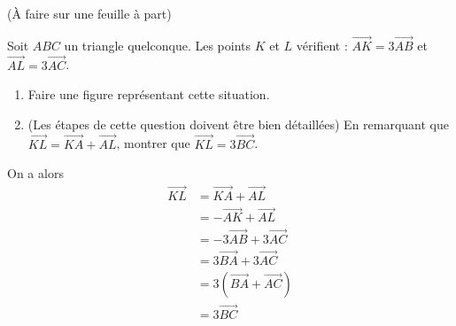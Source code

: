 \documentclass[
	classe=$2^{de}$
]{évaluation}
\begin{document}
\begin{exercice}(À faire sur une feuille à part)

	Soit $ABC$ un triangle quelconque. Les points $K$ et $L$ vérifient : $\vec{AK} = 3\vec{AB}$ et $\vec{AL} = 3\vec{AC}$.
	\begin{enumerate}
		\item Faire une figure représentant cette situation.
		\item (Les étapes de cette question doivent être bien détaillées) En remarquant que $\vec{KL} = \vec{KA} + \vec{AL}$, montrer que $\vec{KL} = 3\vec{BC}$.
	\end{enumerate}

	\ifdefined\makeCorrection
		\begin{center}
		\end{center}

		{\color{red}
		On a alors
		\begin{align*}
			\vec{KL} & = \vec{KA} + \vec{AL}    \\
			         & = -\vec{AK} + \vec{AL}   \\
			         & = -3\vec{AB} + 3\vec{AC} \\
			         & = 3\vec{BA} + 3\vec{AC}  \\
			         & = 3(\vec{BA} + \vec{AC}) \\
			         & = 3\vec{BC}
		\end{align*}
		}
	\fi
\end{exercice}
\end{document}
